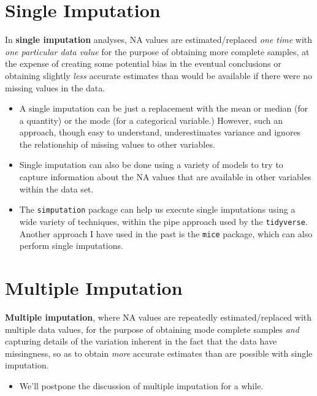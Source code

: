 \documentclass[]{book}
\providecommand{\tightlist}{%
  \setlength{\itemsep}{0pt}\setlength{\parskip}{0pt}}
\theoremstyle{definition}
\theoremstyle{definition}
\theoremstyle{definition}
\theoremstyle{remark}
\begin{document}
\section{Single Imputation}\label{single-imputation}

In \textbf{single imputation} analyses, NA values are estimated/replaced
\emph{one time} with \emph{one particular data value} for the purpose of
obtaining more complete samples, at the expense of creating some
potential bias in the eventual conclusions or obtaining slightly
\emph{less} accurate estimates than would be available if there were no
missing values in the data.

\begin{itemize}
\tightlist
\item
  A single imputation can be just a replacement with the mean or median
  (for a quantity) or the mode (for a categorical variable.) However,
  such an approach, though easy to understand, underestimates variance
  and ignores the relationship of missing values to other variables.
\item
  Single imputation can also be done using a variety of models to try to
  capture information about the NA values that are available in other
  variables within the data set.
\item
  The \texttt{simputation} package can help us execute single
  imputations using a wide variety of techniques, within the pipe
  approach used by the \texttt{tidyverse}. Another approach I have used
  in the past is the \texttt{mice} package, which can also perform
  single imputations.
\end{itemize}

\section{Multiple Imputation}\label{multiple-imputation}

\textbf{Multiple imputation}, where NA values are repeatedly
estimated/replaced with multiple data values, for the purpose of
obtaining mode complete samples \emph{and} capturing details of the
variation inherent in the fact that the data have missingness, so as to
obtain \emph{more} accurate estimates than are possible with single
imputation.

\begin{itemize}
\tightlist
\item
  We'll postpone the discussion of multiple imputation for a while.
\end{itemize}
\end{document}
